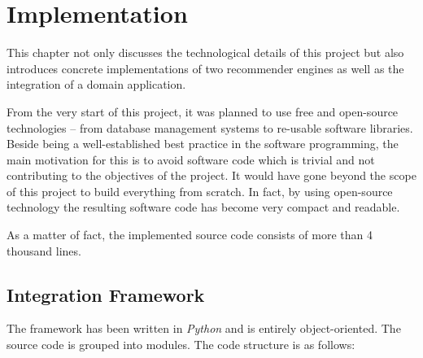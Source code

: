 \chapter{Implementation}

This chapter not only discusses the technological details of this project but also introduces concrete implementations of two recommender engines as well as the integration of a domain application.

From the very start of this project, it was planned to use free and open-source technologies -- from database management systems to re-usable software libraries. Beside being a well-established best practice in the software programming, the main motivation for this is to avoid software code which is trivial and not contributing to the objectives of the project. It would have gone beyond the scope of this project to build everything from scratch. In fact, by using open-source technology the resulting software code has become very compact and readable.

As a matter of fact, the implemented source code consists of more than 4 thousand lines.

\section{Integration Framework}

The framework has been written in \emph{Python} and is entirely object-oriented. The source code is grouped into modules. The code structure is as follows:

